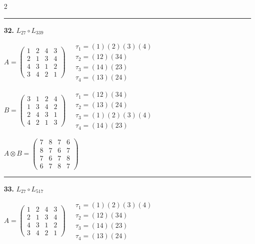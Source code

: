 \begin{multicols}{2}
\vspace{0.3em}
\hrule
\vspace{0.3em}

\noindent\textbf{32.} $L_{27} \circ L_{339}$

$A = \begin{pmatrix} 1 & 2 & 4 & 3 \\ 2 & 1 & 3 & 4 \\ 4 & 3 & 1 & 2 \\ 3 & 4 & 2 & 1 \end{pmatrix} \quad \begin{matrix} \tau_{1}=(1)(2)(3)(4) \\ \tau_{2}=(1 2)(3 4) \\ \tau_{3}=(1 4)(2 3) \\ \tau_{4}=(1 3)(2 4) \end{matrix}$

$B = \begin{pmatrix} 3 & 1 & 2 & 4 \\ 1 & 3 & 4 & 2 \\ 2 & 4 & 3 & 1 \\ 4 & 2 & 1 & 3 \end{pmatrix} \quad \begin{matrix} \tau_{1}=(1 2)(3 4) \\ \tau_{2}=(1 3)(2 4) \\ \tau_{3}=(1)(2)(3)(4) \\ \tau_{4}=(1 4)(2 3) \end{matrix}$

$A \otimes B = \begin{pmatrix} 7 & 8 & 7 & 6 \\ 8 & 7 & 6 & 7 \\ 7 & 6 & 7 & 8 \\ 6 & 7 & 8 & 7 \end{pmatrix}$

\vspace{0.3em}
\hrule
\vspace{0.3em}

\noindent\textbf{33.} $L_{27} \circ L_{517}$

$A = \begin{pmatrix} 1 & 2 & 4 & 3 \\ 2 & 1 & 3 & 4 \\ 4 & 3 & 1 & 2 \\ 3 & 4 & 2 & 1 \end{pmatrix} \quad \begin{matrix} \tau_{1}=(1)(2)(3)(4) \\ \tau_{2}=(1 2)(3 4) \\ \tau_{3}=(1 4)(2 3) \\ \tau_{4}=(1 3)(2 4) \end{matrix}$


\end{multicols}
